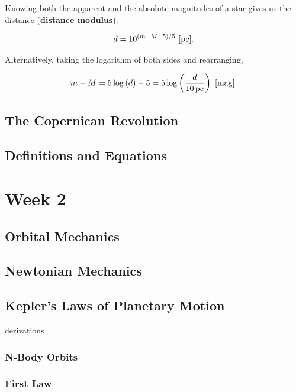 \documentclass[a4paper,10pt]{article}
\begin{document}
Knowing both the apparent and the absolute magnitudes of a star gives us the distance (\textbf{distance modulus}):

\begin{align*}
    d = 10^{(m-M+5)/5}~[{\rm pc}].
\end{align*}

Alternatively, taking the logarithm of both sides and rearranging, 

\begin{align*}
    m-M = 5\log\left(d\right)-5 = 5\log\left({\frac{d}{10\,{\rm pc}}}\right)~[{\rm mag}].
\end{align*}





\subsection{The Copernican Revolution}

\subsection{Definitions and Equations}


\newpage
\section{Week 2}

\subsection{Orbital Mechanics}

\subsection{Newtonian Mechanics}

\subsection{Kepler's Laws of Planetary Motion}
derivations
\subsubsection{N-Body Orbits}
\subsubsection{First Law}
\end{document}
